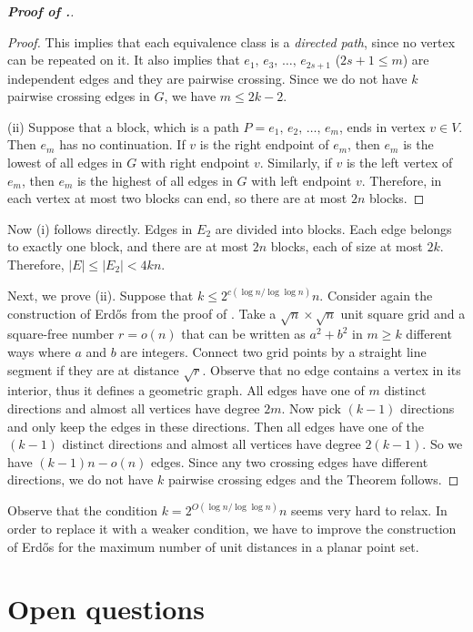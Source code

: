 \documentclass[a4paper,10pt]{article}
\begin{document}
\begin{proof}[\bf Proof of .]
\begin{proof}
This implies that each equivalence class is a {\em directed path}, since no vertex can be repeated on it. It also implies that $e_1, \, e_3, \, \dots, \, e_{2s+1}$ ($2s+1\le m$) are independent edges and they are pairwise crossing. Since we do not have $k$ pairwise crossing edges in $G$, we have $m\le 2k-2$.


(ii) Suppose that a block, which is a path
$P= e_1, \, e_2, \, \dots, \, e_m$, ends in vertex $v\in V$.
Then $e_m$ has no continuation. If $v$ is the right endpoint of $e_m$, then $e_m$ is the lowest of all edges in $G$ with right endpoint $v$. Similarly, if $v$ is the left vertex of $e_m$, then $e_m$ is the highest of all edges in $G$ with left endpoint $v$. Therefore, in each vertex at most two blocks can end, so there are at most $2n$ blocks.
\end{proof}


Now  (i) follows directly. Edges in $E_2$ are divided into blocks. Each edge belongs to exactly one block, and there are at most $2n$ blocks, each of size at most $2k$. Therefore, $|E|\le |E_2|< 4kn$.

\smallskip

Next, we prove  (ii). Suppose that  $k\le 2^{c\left(\log n/\log\log n \right)}n$. Consider again the construction of Erd\H os from the proof of .
Take a  $\sqrt{n}\times\sqrt{n}$ unit square grid and a square-free number $r=o(n)$ that can be written as
$a^2+b^2$ in $m\ge k$ different ways where $a$ and $b$ are integers. Connect two grid points by a straight line segment
if they are at distance $\sqrt{r}$. Observe that no edge contains a vertex in its interior, thus it defines a geometric graph. All edges have one of $m$ distinct directions and almost all vertices have degree $2m$. Now pick $(k-1)$ directions and only keep the edges in these directions. Then all edges have one of the $(k-1)$ distinct directions and almost all vertices have degree $2(k-1)$. So we have $(k-1)n-o(n)$ edges. Since any two crossing edges have different directions, we do not have $k$ pairwise crossing edges and the Theorem follows.
\end{proof}

Observe that the condition $k=2^{O\left(\log n/\log\log n \right)}n$ seems very hard to relax. In order to replace it with a weaker condition, we have to improve the construction of Erd\H os \cite{E46} for the maximum number of unit distances in a planar point set.

\section{Open questions} \label{open_questions}
\end{document}
